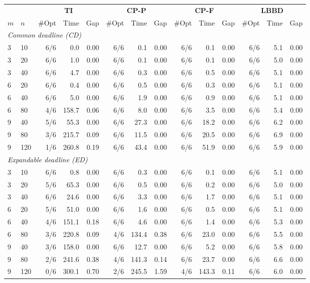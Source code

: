 \begin{tabular*}{\textwidth}{@{\extracolsep\fill}ll rrr rrr rrr rrr@{\extracolsep\fill}}
\toprule
 &  & \multicolumn{3}{c}{\textbf{TI}} & \multicolumn{3}{c}{\textbf{CP-P}} & \multicolumn{3}{c}{\textbf{CP-F}} & \multicolumn{3}{c}{\textbf{LBBD}} \\
\cmidrule{3-5}\cmidrule{6-8}\cmidrule{9-11}\cmidrule{12-14}
$m$ & $n$ & \#Opt & Time & Gap & \#Opt & Time & Gap & \#Opt & Time & Gap & \#Opt & Time & Gap \\
\midrule
\multicolumn{14}{l}{\textit{Common deadline (CD)}} \\
3 & 10 & 6/6 & 0.0 & 0.00 & 6/6 & 0.1 & 0.00 & 6/6 & 0.1 & 0.00 & 6/6 & 5.1 & 0.00 \\
3 & 20 & 6/6 & 1.0 & 0.00 & 6/6 & 0.1 & 0.00 & 6/6 & 0.1 & 0.00 & 6/6 & 5.0 & 0.00 \\
3 & 40 & 6/6 & 4.7 & 0.00 & 6/6 & 0.3 & 0.00 & 6/6 & 0.5 & 0.00 & 6/6 & 5.1 & 0.00 \\
6 & 20 & 6/6 & 0.4 & 0.00 & 6/6 & 0.5 & 0.00 & 6/6 & 0.3 & 0.00 & 6/6 & 5.1 & 0.00 \\
6 & 40 & 6/6 & 5.0 & 0.00 & 6/6 & 1.9 & 0.00 & 6/6 & 0.9 & 0.00 & 6/6 & 5.1 & 0.00 \\
6 & 80 & 4/6 & 158.7 & 0.06 & 6/6 & 8.0 & 0.00 & 6/6 & 3.5 & 0.00 & 6/6 & 5.4 & 0.00 \\
9 & 40 & 5/6 & 55.3 & 0.00 & 6/6 & 27.3 & 0.00 & 6/6 & 18.2 & 0.00 & 6/6 & 6.2 & 0.00 \\
9 & 80 & 3/6 & 215.7 & 0.09 & 6/6 & 11.5 & 0.00 & 6/6 & 20.5 & 0.00 & 6/6 & 6.9 & 0.00 \\
9 & 120 & 1/6 & 260.8 & 0.19 & 6/6 & 43.4 & 0.00 & 6/6 & 51.9 & 0.00 & 6/6 & 5.9 & 0.00 \\
\midrule
\multicolumn{14}{l}{\textit{Expandable deadline (ED)}} \\
3 & 10 & 6/6 & 0.8 & 0.00 & 6/6 & 0.3 & 0.00 & 6/6 & 0.1 & 0.00 & 6/6 & 5.1 & 0.00 \\
3 & 20 & 5/6 & 65.3 & 0.00 & 6/6 & 0.5 & 0.00 & 6/6 & 0.2 & 0.00 & 6/6 & 5.0 & 0.00 \\
3 & 40 & 6/6 & 24.6 & 0.00 & 6/6 & 3.3 & 0.00 & 6/6 & 1.7 & 0.00 & 6/6 & 5.1 & 0.00 \\
6 & 20 & 5/6 & 51.0 & 0.00 & 6/6 & 1.6 & 0.00 & 6/6 & 0.5 & 0.00 & 6/6 & 5.1 & 0.00 \\
6 & 40 & 4/6 & 151.1 & 0.18 & 6/6 & 4.6 & 0.00 & 6/6 & 1.4 & 0.00 & 6/6 & 5.3 & 0.00 \\
6 & 80 & 3/6 & 220.8 & 0.09 & 4/6 & 134.4 & 0.38 & 6/6 & 23.0 & 0.00 & 6/6 & 5.5 & 0.00 \\
9 & 40 & 3/6 & 158.0 & 0.00 & 6/6 & 12.7 & 0.00 & 6/6 & 5.2 & 0.00 & 6/6 & 5.8 & 0.00 \\
9 & 80 & 2/6 & 241.6 & 0.38 & 4/6 & 141.3 & 0.14 & 6/6 & 23.7 & 0.00 & 6/6 & 6.6 & 0.00 \\
9 & 120 & 0/6 & 300.1 & 0.70 & 2/6 & 245.5 & 1.59 & 4/6 & 143.3 & 0.11 & 6/6 & 6.0 & 0.00 \\
\bottomrule
\end{tabular*}
